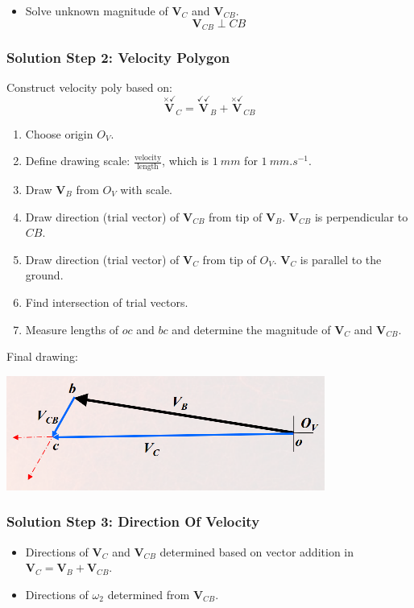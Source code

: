 \documentclass[11pt]{article}
\begin{document}
\begin{itemize}
\item Solve unknown magnitude of \(\boldsymbol{V}_C\) and \(\boldsymbol{V}_{CB}\).
\[\boldsymbol{V}_{CB} \perp CB\]
\end{itemize}
\subsubsection{Solution Step 2: Velocity Polygon}
\label{sec:orgf60f6b4}
Construct velocity poly based on:
\[\overset{\times \checkmark}{\boldsymbol{V}}_C = \overset{\checkmark \checkmark}{\boldsymbol{V}}_B + \overset{\times \checkmark}{\boldsymbol{V}}_{CB}\]

\begin{enumerate}
\item Choose origin \(O_V\).
\item Define drawing scale: \(\frac{\text{velocity}}{\text{length}}\), which is \(\qty{1}{mm}\) for \(\qty{1}{mm.s^{-1}}\).
\item Draw \(\boldsymbol{V}_B\) from \(O_V\) with scale.
\item Draw direction (trial vector) of \(\boldsymbol{V}_{CB}\) from tip of \(\boldsymbol{V}_B\). \(\boldsymbol{V}_{CB}\) is perpendicular to \(CB\).
\item Draw direction (trial vector) of \(\boldsymbol{V}_C\) from tip of \(O_V\). \(\boldsymbol{V}_C\) is parallel to the ground.
\item Find intersection of trial vectors.
\item Measure lengths of \(oc\) and \(bc\) and determine the magnitude of \(\boldsymbol{V}_C\) and \(\boldsymbol{V}_{CB}\).
\end{enumerate}

Final drawing:
\begin{center}
\includegraphics[width=.9\linewidth]{./images/slider-crank-linkage-graphical-analysis-example-velocity-polygon.png}
\end{center}

 \newpage
\subsubsection{Solution Step 3: Direction Of Velocity}
\label{sec:orge8d7732}
\begin{itemize}
\item Directions of \(\boldsymbol{V}_C\) and \(\boldsymbol{V}_{CB}\) determined based on vector addition in \(\boldsymbol{V}_C = \boldsymbol{V}_B + \boldsymbol{V}_{CB}\).
\item Directions of \(\omega_2\) determined from \(\boldsymbol{V}_{CB}\).
\end{itemize}
\end{document}
